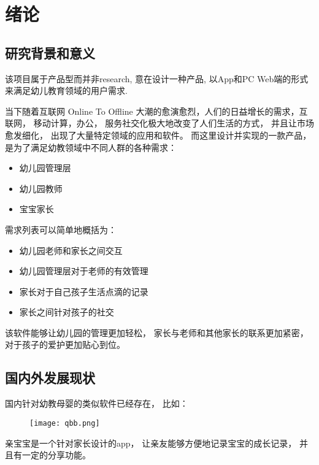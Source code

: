 \chapter{绪论}

\section{研究背景和意义}

该项目属于产品型而并非research, 意在设计一种产品, 以App和PC Web端的形式来满足幼儿教育领域的用户需求.   



当下随着互联网 Online To Offline 大潮的愈演愈烈，人们的日益增长的需求，互联网， 移动计算，办公， 服务社交化极大地改变了人们生活的方式， 并且让市场愈发细化， 出现了大量特定领域的应用和软件。 而这里设计并实现的一款产品， 是为了满足幼教领域中不同人群的各种需求：


\begin{itemize}
	\item 幼儿园管理层
	\item 幼儿园教师
	\item 宝宝家长
\end{itemize}


需求列表可以简单地概括为：

\begin{itemize}
	\item 幼儿园老师和家长之间交互
	\item  幼儿园管理层对于老师的有效管理
	\item 家长对于自己孩子生活点滴的记录
	\item 家长之间针对孩子的社交
\end{itemize}

该软件能够让幼儿园的管理更加轻松， 家长与老师和其他家长的联系更加紧密， 对于孩子的爱护更加贴心到位。


\section{国内外发展现状}

国内针对幼教母婴的类似软件已经存在， 比如：

\begin{figure}[H]
	\centering
	\texttt{[image: qbb.png]}
	\label{fig:qinbaobao}
\end{figure}

亲宝宝是一个针对家长设计的app， 让亲友能够方便地记录宝宝的成长记录， 并且有一定的分享功能。

